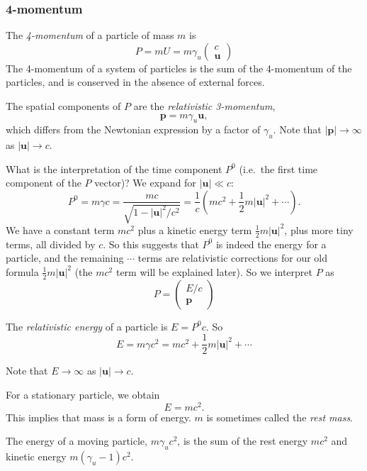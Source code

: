 \documentclass[a4paper]{article}
\begin{document}
\subsubsection*{4-momentum}
\begin{defi}[4-momentum]
  The \emph{4-momentum} of a particle of mass $m$ is
  \[
    P = mU = m\gamma_u
    \begin{pmatrix}
      c\\
      \mathbf{u}
    \end{pmatrix}
  \]
  The 4-momentum of a system of particles is the sum of the 4-momentum of the particles, and is conserved in the absence of external forces.

  The spatial components of $P$ are the \emph{relativistic 3-momentum},
  \[
    \mathbf{p} = m\gamma_u \mathbf{u},
  \]
  which differs from the Newtonian expression by a factor of $\gamma_u$. Note that $|\mathbf{p}| \to \infty$ as $|\mathbf{u}| \to c$.
\end{defi}

What is the interpretation of the time component $P^0$ (i.e.\ the first time component of the $P$ vector)? We expand for $|\mathbf{u}| \ll c$:
\[
  P^0 = m\gamma c = \frac{mc}{\sqrt{1 - |\mathbf{u}|^2/c^2}} = \frac{1}{c}\left(mc^2 + \frac{1}{2}m|\mathbf{u}|^2 + \cdots\right).
\]
We have a constant term $mc^2$ plus a kinetic energy term $\frac{1}{2}m|\mathbf{u}|^2$, plus more tiny terms, all divided by $c$. So this suggests that $P^0$ is indeed the energy for a particle, and the remaining $\cdots$ terms are relativistic corrections for our old formula $\frac{1}{2}m|\mathbf{u}|^2$ (the $mc^2$ term will be explained later). So we interpret $P$ as
\[
  P =
  \begin{pmatrix}
    E/c\\
    \mathbf{p}
  \end{pmatrix}
\]
\begin{defi}
  The \emph{relativistic energy} of a particle is $E = P^0c$. So
  \[
    E = m\gamma c^2 = mc^2 + \frac{1}{2}m|\mathbf{u}|^2 + \cdots
  \]
\end{defi}
Note that $E\to \infty$ as $|\mathbf{u}| \to c$.

For a stationary particle, we obtain
\[
  E = mc^2.
\]
This implies that mass is a form of energy. $m$ is sometimes called the \emph{rest mass}.

The energy of a moving particle, $m\gamma_u c^2$, is the sum of the rest energy $mc^2$ and kinetic energy $m(\gamma_u - 1)c^2$.
\end{document}
